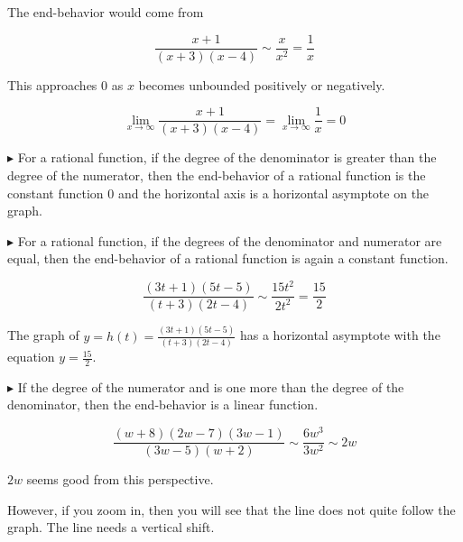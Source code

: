 \documentclass{ximera}
\begin{document}
The end-behavior would come from 


\[ \frac{x+1}{(x+3)(x-4)}    \sim    \frac{x}{x^2} = \frac{1}{x}  \]


This approaches $0$ as $x$ becomes unbounded positively or negatively. 



\[
\lim\limits_{x \to \infty} \frac{x+1}{(x+3)(x-4)} = \lim\limits_{x \to \infty} \frac{1}{x} = 0
\]









$\blacktriangleright$   For a rational function, if the degree of the denominator is greater than the degree of the numerator, then the end-behavior of a rational function is the constant function $0$ and the horizontal axis is a horizontal asymptote on the graph.




$\blacktriangleright$   For a rational function, if the degrees of the denominator and numerator are equal, then the end-behavior of a rational function is again a constant function.


\[ \frac{(3t+1)(5t-5)}{(t+3)(2t-4)}    \sim    \frac{15t^2}{2t^2} = \frac{15}{2}  \]




The graph of $y = h(t) = \frac{(3t+1)(5t-5)}{(t+3)(2t-4)} $ has a horizontal asymptote with the equation $y = \frac{15}{2}$.




$\blacktriangleright$   If the degree of the numerator and is one more than the degree of the denominator, then the end-behavior is a linear function.


\[ \frac{(w+8)(2w-7)(3w-1)}{(3w-5)(w+2)}    \sim   \frac{6w^3}{3w^2} \sim 2w \]








\begin{center}
\end{center}


$2w$ seems good from this perspective.

However, if you zoom in, then you will see that the line does not quite follow the graph. The line needs a vertical shift.







\begin{center}
\end{center}
\end{document}
